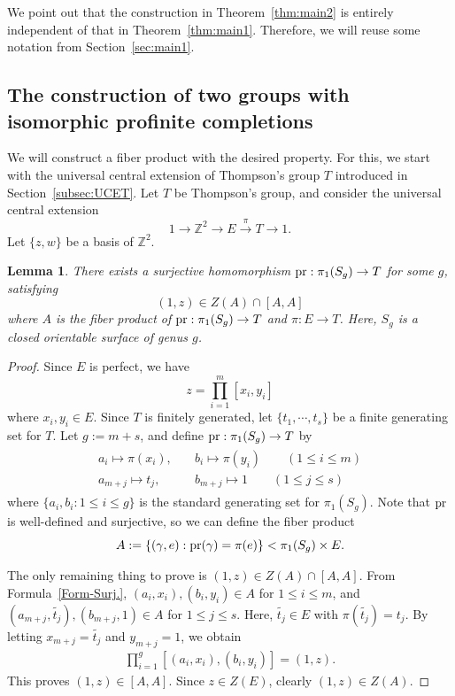 \documentclass[11pt]{amsart}
\newtheorem{lem}[thm]{Lemma}
\theoremstyle{definition}
\newcommand{\ZZ}{\mathbb{Z}}
\begin{document}
 We point out that the construction in Theorem~\ref{thm:main2} is entirely independent of that in Theorem~\ref{thm:main1}.
 Therefore, we will reuse some notation from Section~\ref{sec:main1}.

\subsection{The construction of two groups with isomorphic profinite completions}

 We will construct a fiber product with the desired property.
 For this, we start with the universal central extension of Thompson's group $T$ introduced in Section~\ref{subsec:UCET}.
 Let $T$ be Thompson's group, and consider the universal central extension
 $$ 1 \to \ZZ^2 \to E \overset{\pi}{\to} T \to 1.$$
 Let $\{z, w\}$ be a basis of $\ZZ^2$.

\begin{lem} \label{Lem:Fiber_product1}
 There exists a surjective homomorphism $\textnormal{pr} : \pi_1(S_g) \to T$ for some $g$, satisfying $$(1,z) \in Z(A) \cap [A,A]$$
 where $A$ is the fiber product of $\textnormal{pr}:\pi_1(S_g) \to T$ and $\pi:E \to T$.
 Here, $S_g$ is a closed orientable surface of genus $g$.
\end{lem}
\begin{proof}
 Since $E$ is perfect, we have
 $$ z = \prod_{i=1}^m [x_i,y_i] $$
 where $x_i,y_i \in E$.
 Since $T$ is finitely generated, let $\{ t_1, \cdots, t_s \}$ be a finite generating set for $T$.
 Let $g:=m+s$, and define $\textnormal{pr} : \pi_1(S_g) \to T$ by
\begin{align} \label{Form-Surj.}
\begin{split}
a_i \mapsto \pi(x_i), \quad &b_i \mapsto \pi(y_i) \qquad (1 \leq i \leq m) \\
a_{m+j} \mapsto t_j, \quad &b_{m+j} \mapsto 1 \qquad (1 \leq j \leq s)
\end{split}
\end{align}
where $\{a_i, b_i : 1 \leq i \leq g \}$ is the standard generating set for $\pi_1(S_g)$.
  Note that $\textnormal{pr}$ is well-defined and surjective, so we can define the fiber product 
 $$ A:= \left\{ (\gamma,e) : \textnormal{pr}(\gamma)=\pi(e) \right\}<\pi_1(S_g) \times E. $$

 The only remaining thing to prove is $(1,z) \in Z(A) \cap [A,A]$.
 From Formula~\eqref{Form-Surj.}, $(a_i,x_i), (b_i,y_i) \in A$ for $1 \leq i \leq m$, and $(a_{m+j},\tilde{t_j}), (b_{m+j},1) \in A$ for $1 \leq j \leq s$. 
 Here, $\tilde{t_j} \in E$ with $\pi(\tilde{t_j})=t_j$.
 By letting $x_{m+j}=\tilde{t_j}$ and $y_{m+j}=1$, we obtain
 \begin{align} \label{commutator-z}
  \prod_{i=1}^g \left[ (a_i,x_i),(b_i,y_i) \right]=(1,z).
  \end{align}
 This proves $(1,z) \in [A,A]$.
 Since $z \in Z(E)$, clearly $(1,z) \in Z(A)$.
\end{proof}
\end{document}
